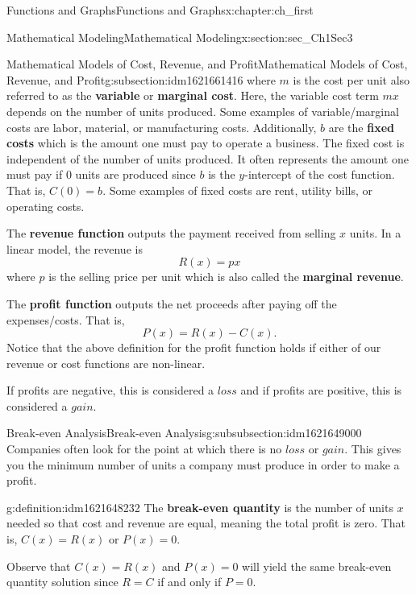 \documentclass[oneside,10pt,]{book}
\newcommand{\terminology}[1]{\textbf{#1}}
\numberwithin{equation}{section}
\begin{document}
\begin{chapterptx}{Functions and Graphs}{}{Functions and Graphs}{}{}{x:chapter:ch_first}
\begin{sectionptx}{Mathematical Modeling}{}{Mathematical Modeling}{}{}{x:section:sec_Ch1Sec3}
\begin{subsectionptx}{Mathematical Models of Cost, Revenue, and Profit}{}{Mathematical Models of Cost, Revenue, and Profit}{}{}{g:subsection:idm1621661416}
where \(m\) is the cost per unit also referred to as the \terminology{variable} or \terminology{marginal cost}. Here, the variable cost term \(mx\) depends on the number of units produced. Some examples of variable\slash{}marginal costs are labor, material, or manufacturing costs. Additionally, \(b\) are the \terminology{fixed costs} which is the amount one must pay to operate a business. The fixed cost is independent of the number of units produced. It often represents the amount one must pay if 0 units are produced since \(b\) is the \(y\)-intercept of the cost function. That is, \(C(0)=b\). Some examples of fixed costs are rent, utility bills, or operating costs.%
\par
The \terminology{revenue function} outputs the payment received from selling \(x\) units. In a linear model, the revenue is%
%
\begin{equation*}
R(x)=px
\end{equation*}
where \(p\) is the selling price per unit which is also called the \terminology{marginal revenue}.%
\par
The \terminology{profit function} outputs the net proceeds after paying off the expenses\slash{}costs. That is,%
%
\begin{equation*}
P(x)=R(x)-C(x)\text{.}
\end{equation*}
Notice that the above definition for the profit function holds if either of our revenue or cost functions are non-linear.%
\par
If profits are negative, this is considered a \(loss\) and if profits are positive, this is considered a \(gain\).%
%
%
\typeout{************************************************}
\typeout{************************************************}
%
\begin{subsubsectionptx}{Break-even Analysis}{}{Break-even Analysis}{}{}{g:subsubsection:idm1621649000}
Companies often look for the point at which there is no \(loss\) or \(gain\). This gives you the minimum number of units a company must produce in order to make a profit.%
\begin{definition}{}{g:definition:idm1621648232}%
The \terminology{break-even quantity} is the number of units \(x\) needed so that cost and revenue are equal, meaning the total profit is zero. That is, \(C(x)=R(x)\) or \(P(x)=0\).\end{definition}
Observe that \(C(x)=R(x)\) and \(P(x)=0\) will yield the same break-even quantity solution since \(R=C\) if and only if \(P=0\).%

\end{subsubsectionptx}
\end{subsectionptx}
\end{sectionptx}
\end{chapterptx}
\end{document}
